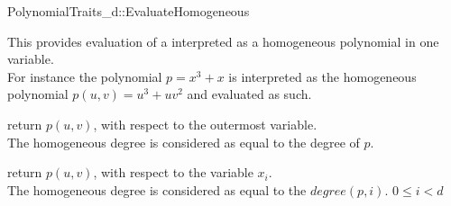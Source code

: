 \begin{ccRefConcept}{PolynomialTraits_d::EvaluateHomogeneous}
\ccDefinition

This  provides evaluation of a 
 interpreted as a homogeneous polynomial 
in one variable.  \\
For instance the polynomial $p = x^3 + x$ is interpreted as the homogeneous polynomial
$p(u,v) = u^3 + uv^2$ and evaluated as such. 

\ccRefines 
{}

\ccTypes


\ccOperations
{}
         { return $p(u,v)$, with respect to the outermost variable. \\
           The homogeneous degree is considered as equal to the degree of $p$.  }


          { return $p(u,v)$, with respect to the variable $x_i$. \\
            The homogeneous degree is considered as equal to the $degree(p,i)$.
            \ccPrecond $0 \leq i  < d$}


\ccSeeAlso

\\
\\

\end{ccRefConcept}
